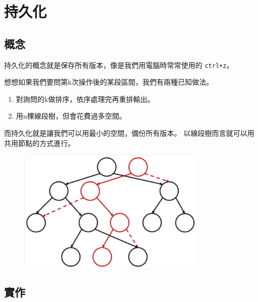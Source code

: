 \section{持久化}
    \subsection{概念}
    持久化的概念就是保存所有版本，像是我們用電腦時常常使用的
    \verb|ctrl+z|。

    想想如果我們要問第k次操作後的某段區間，我們有兩種已知做法。

    \begin{enumerate}
        \item 對詢問的k做排序，依序處理完再重排輸出。
        \item 用n棵線段樹，但會花費過多空間。
    \end{enumerate}

    而持久化就是讓我們可以用最小的空間，備份所有版本。
    以線段樹而言就可以用共用節點的方式進行。

    \begin{figure}[!htbp]
        \centering
        \includegraphics[width=0.8\textwidth]{../Images/SEG3.png}
    \end{figure}

    \subsection{實作}

